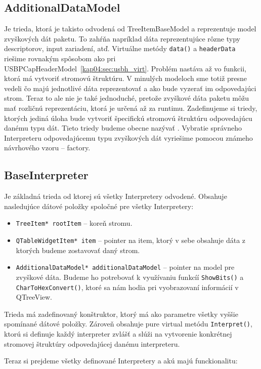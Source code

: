 \subsection{AdditionalDataModel}
Je trieda, ktorá je takisto odvodená od TreeItemBaseModel a reprezentuje model zvyškových dát paketu. To zahŕňa napríklad dáta reprezentujúce rôzne typy descriptorov, input zariadení, atď. Virtuálne metódy \texttt{data()} a \texttt{headerData} riešime rovnakým spôsobom ako pri USBPCapHeaderModel~\ref{kap04:sec:usbh_virt}. Problém nastáva až vo funkcii, ktorá má vytvoriť stromovú štruktúru. V minulých modeloch sme totiž presne vedeli čo majú jednotlivé dáta reprezentovať a ako bude vyzerať im odpovedajúci strom. Teraz to ale nie je také jednoduché, pretože zvyškové dáta paketu môžu mať rozličnú reprezentáciu, ktorá je určená až za runtimu. Zadefinujeme si triedy, ktorých jediná úloha bude vytvoriť špecifickú stromovú štruktúru odpovedajúcu danému typu dát. Tieto triedy budeme obecne nazývať . Vybratie správneho Interpreteru odpovedajúcemu typu zvyškových dát vyriešime pomocou známeho návrhového vzoru -- factory.

\subsection{BaseInterpreter}
Je základná trieda od ktorej sú všetky Interpretery odvodené. Obsahuje nasledujúce dátové položky spoločné pre všetky Interpretery:
\begin{itemize}
\item \texttt{TreeItem* rootItem} -- koreň stromu.
\item \texttt{QTableWidgetItem* item} -- pointer na item, ktorý v sebe obsahuje dáta z ktorých budeme zostavovať daný strom.
\item \texttt{AdditionalDataModel* additionalDataModel} -- pointer na model \newline pre zvyškové dáta. Budeme ho potrebovať k využívaniu funkcíí \texttt{ShowBits()} a \texttt{CharToHexConvert()}, ktoré sa nám hodia pri vyobrazovaní informácií v QTreeView.
\end{itemize}

Trieda má zadefinovaný konštruktor, ktorý má ako parametre všetky vyššie spomínané dátové položky. Zároveň obsahuje pure virtual metódu \texttt{Interpret()}, ktorú si definuje každý interpreter zvlášť a slúži na vytvorenie konkrétnej stromovej štruktúry odpovedajúcej danému interpreteru.

Teraz si prejdeme všetky definované Interpretery a akú majú funckionalitu:

